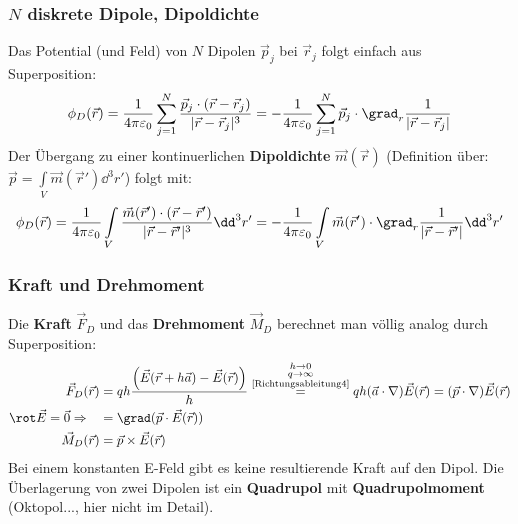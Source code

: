	  \subsubsection{$N$ diskrete Dipole, Dipoldichte}
			  Das Potential (und Feld) von $N$ Dipolen $\vec{p}_j$ bei $\vec{r} _j$ folgt einfach aus Superposition:
			        \begin{equation}\begin{split}
					        \phi_D(\vec{r} ) = \frac{1}{4\pi\varepsilon_0} \sum_{j=1}^N \frac{\vec{p}_j\cdot ( \vec{r} -\vec{r} _j)}{|\vec{r} -\vec{r} _j|^3} = -\frac{1}{4\pi\varepsilon_0} \sum_{j=1}^N \vec{p}_j\cdot \grad _r \frac{1}{|\vec{r} -\vec{r} _j|}
				        \end{split}\end{equation}
			   Der Übergang zu einer kontinuerlichen \textbf{Dipoldichte} $\vec{m}(\vec{r} )$ (Definition über: $\vec{p} = \int\limits_V \vec{m}(\vec{r}' )\dd^3 r'$) folgt mit:
			        \begin{equation}\begin{split}
					        \phi_D(\vec{r} ) = \frac{1}{4\pi\varepsilon_0} \int\limits_V \frac{\vec{m}(\vec{r}' )\cdot ( \vec{r} -\vec{r}' )}{|\vec{r} -\vec{r}' |^3} \dd^3 r'= -\frac{1}{4\pi\varepsilon_0} \int\limits_V \vec{m}(\vec{r}' )\cdot \grad _r \frac{1}{|\vec{r} -\vec{r}' |}  \dd^3 r'
				        \end{split}\end{equation}
			        \subsubsection{Kraft und Drehmoment}
			   Die \textbf{Kraft} $\vec{F}_D$ und das \textbf{Drehmoment} $\vec{M}_D$ berechnet man völlig analog durch Superposition:
			        \begin{equation}\begin{split}
					        \vec{F}_D(\vec{r} ) &= qh\frac{\left(\vec{E}(\vec{r}+h\vec{a})-\vec{E}(\vec{r})\right)}{h}\stackrel{\substack{h\to 0\\q\to\infty\\\text{\ref{Richtungsableitung4}}}}{=}qh(\vec{a}\cdot\nabla)\vec{E}(\vec{r})= (\vec{p}\cdot\nabla) \vec{E}(\vec{r} ) \\\rot \vec{E}=\vec{0}\Rightarrow\quad&= \grad (\vec{p}\cdot \vec{E}(\vec{r} ))\\
					        \vec{M}_D(\vec{r} ) &= \vec{p} \times \vec{E}(\vec{r} )
				        \end{split}\end{equation}
			        Bei einem konstanten E-Feld gibt es keine resultierende Kraft auf den Dipol.
			   Die Überlagerung von zwei Dipolen ist ein \textbf{Quadrupol} mit \textbf{Quadrupolmoment} (Oktopol..., hier nicht im Detail). 
